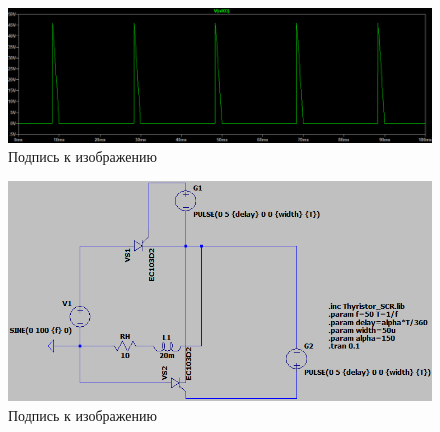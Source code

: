 \documentclass[a4paper, 12pt]{article}
\begin{document}
    \begin{figure}[H]
        \centering
        \includegraphics[scale=0.45]{a150_U1.9308V.png}
        \captionsetup{skip=0pt}
        \caption{Подпись к изображению}
        \label{fig:a150_U1.9308V}
    \end{figure}


    \begin{figure}[H]
        \centering
        \includegraphics[scale=0.5]{scheme2.png}
        \captionsetup{skip=0pt}
        \caption{Подпись к изображению}
        \label{fig:scheme2}
    \end{figure}
\end{document}
